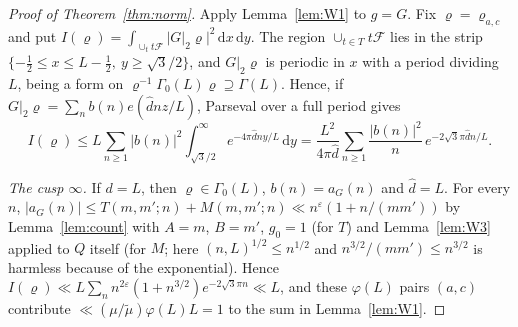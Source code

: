 \documentclass[11pt]{amsart}
\theoremstyle{remark}
\newcommand{\cF}{\mathcal{F}}
\newcommand{\e}{\varepsilon}
\newcommand{\dd}{\mathrm{d}}
\begin{document}
\begin{proof}[Proof of Theorem~\ref{thm:norm}]
Apply Lemma~\ref{lem:W1} to $g=G$. Fix $\varrho=\varrho_{a,c}$ and put $I(\varrho)=\int_{\cup_tt\cF}|G|_2\varrho|^2\,\dd x\,\dd y$. The region $\cup_{t\in T}t\cF$ lies in the strip $\{-\tfrac12\le x\le L-\tfrac12,\ y\ge\sqrt3/2\}$, and $G|_2\varrho$ is periodic in $x$ with a period dividing $L$, being a form on $\varrho^{-1}\Gamma_0(L)\varrho\supseteq\Gamma(L)$. Hence, if $G|_2\varrho=\sum_nb(n)e(\hat dnz/L)$, Parseval over a full period gives
\begin{equation}\label{eq:Irho}
I(\varrho)\le L\sum_{n\ge1}|b(n)|^2\int_{\sqrt3/2}^\infty e^{-4\pi\hat dny/L}\,\dd y
=\frac{L^2}{4\pi\hat d}\sum_{n\ge1}\frac{|b(n)|^2}{n}\,e^{-2\sqrt3\pi\hat dn/L}.
\end{equation}

\emph{The cusp $\infty$.} If $d=L$, then $\varrho\in\Gamma_0(L)$, $b(n)=a_G(n)$ and $\hat d=L$. For every $n$, $|a_G(n)|\le T(m,m';n)+M(m,m';n)\ll n^\e(1+n/(mm'))$ by Lemma~\ref{lem:count} with $A=m$, $B=m'$, $g_0=1$ (for $T$) and Lemma~\ref{lem:W3} applied to $Q$ itself (for $M$; here $(n,L)^{1/2}\le n^{1/2}$ and $n^{3/2}/(mm')\le n^{3/2}$ is harmless because of the exponential). Hence $I(\varrho)\ll L\sum_nn^{2\e}(1+n^{3/2})e^{-2\sqrt3\pi n}\ll L$, and these $\varphi(L)$ pairs $(a,c)$ contribute $\ll(\mu/\tilde\mu)\varphi(L)L=1$ to the sum in Lemma~\ref{lem:W1}.


\end{proof}
\end{document}
